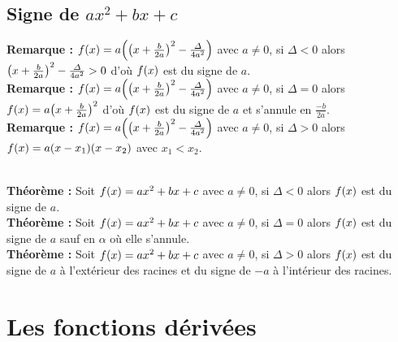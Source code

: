 \documentclass[a4paper,titlepage]{article}
\makeatletter
\let\oldsection\section
\renewcommand\section{\clearpage\oldsection}
\let\oldleft\left
\renewcommand{\left}{\mathopen{}\mathclose\bgroup\oldleft}
\let\oldright\right
\renewcommand{\right}{\aftergroup\egroup\oldright}
\def\tikzscale{1}\begin{lrbox}{\measure@tikzpicture}
\edef\tikzscale{\pgfmathresult}
\makeatother
\begin{document}
    \subsection[Signe de $ax^{2}+bx+c$]{\boldmath Signe de $ax^{2}+bx+c$}
        \textbf{Remarque :} $f\left(x\right)=a\left(\left(x+\frac{b}{2a}\right)^{2}-\frac{\varDelta}{4a^{2}}\right)$ avec $a\neq0$, si $\varDelta<0$ alors $\left(x+\frac{b}{2a}\right)^{2}-\frac{\varDelta}{4a^2}>0$ d’où $f\left(x\right)$ est du signe de $a$.\\
        \textbf{Remarque :} $f\left(x\right)=a\left(\left(x+\frac{b}{2a}\right)^{2}-\frac{\varDelta}{4a^{2}}\right)$ avec $a\neq0$, si $\varDelta=0$ alors $f\left(x\right)=a\left(x+\frac{b}{2a}\right)^{2}$ d’où $f\left(x\right)$ est du signe de $a$ et s’annule en $\frac{-b}{2a}$.\\
        \textbf{Remarque :} $f\left(x\right)=a\left(\left(x+\frac{b}{2a}\right)^{2}-\frac{\varDelta}{4a^{2}}\right)$ avec $a\neq0$, si $\varDelta>0$ alors $f\left(x\right)=a(x-x_{1})(x-x_{2})$ avec $x_{1}<x_{2}$.
        \\
        \begin{scaletikzpicturetowidth}{\textwidth}
        \end{scaletikzpicturetowidth}
        \\
        \textbf{Théorème :} Soit $f\left(x\right)=ax^{2}+bx+c$ avec $a\neq0$, si $\varDelta<0$ alors $f\left(x\right)$ est du signe de $a$.
        \\
        \textbf{Théorème :} Soit $f\left(x\right)=ax^{2}+bx+c$ avec $a\neq0$, si $\varDelta=0$ alors $f\left(x\right)$ est du signe de $a$ sauf en $\alpha$ où elle s’annule.
        \\
        \textbf{Théorème :} Soit $f\left(x\right)=ax^{2}+bx+c$ avec $a\neq0$, si $\varDelta>0$ alors $f\left(x\right)$ est du signe de $a$ à l’extérieur des racines et du signe de $-a$ à l’intérieur des racines.
\section{Les fonctions dérivées}
\end{document}
